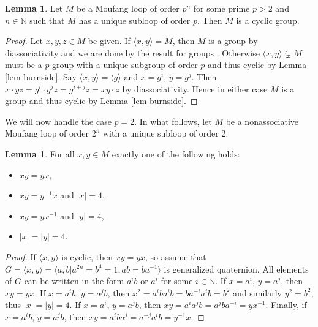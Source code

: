 \documentclass[12pt, twoside, openright]{report}
\theoremstyle{definition}
\newtheorem{lem}[thm]{Lemma}
\begin{document}
\begin{lem}\label{not2power}
	Let $M$ be a Moufang loop of order $p^n$ for some prime $p > 2$ and $n\in\mathbb{N}$ such that $M$ has a
    unique subloop of order $p$. Then $M$ is a cyclic group.
\end{lem}

\begin{proof}
    Let $x, y, z\in M$ be given. If $\langle x, y\rangle = M$, then $M$ is a group by diassociativity and
      we are done by the result for groups \cite{Burnside}. Otherwise $\langle x, y\rangle \subsetneq M$
      must be a $p$-group with a unique subgroup of order $p$ and thus cyclic by Lemma \ref{lem-burnside}.
      Say $\langle x, y\rangle = \langle g\rangle$ and $x = g^i$, $y = g^j$. Then
      $x\cdot yz = g^i \cdot g^j z = g^{i + j}z = xy\cdot z$ by diassociativity. Hence in either case 
      $M$ is a group and thus cyclic by Lemma \ref{lem-burnside}.
\end{proof}

We will now handle the case $p = 2$. In what follows, let $M$ be a nonassociative Moufang loop of order $2^n$
  with a unique subloop of order $2$.

\begin{lem}\label{order-lem}
	For all $x, y\in M$ exactly one of the following holds:
  \begin{itemize}
    \item $xy = yx$,
    \item $xy = y^{-1}x$ and $|x| = 4$,
    \item $xy = yx^{-1}$ and $|y| = 4$,
    \item $|x| = |y| = 4$.
  \end{itemize}
\end{lem}

\begin{proof}
	If $\langle x, y\rangle$ is cyclic, then $xy = yx$, so assume that
    $G = \langle x, y\rangle = \langle a, b | a^{2n} = b^4 = 1, ab = ba^{-1}\rangle$ is generalized
    quaternion. All elements of $G$ can be written in the form $a^i b$ or $a^i$ for some
    $i\in\mathbb{N}$. If $x = a^i$, $y = a^j$, then $xy = yx$. If $x = a^i b$, $y = a^j b$,
    then $x^2 = a^i b a^i b = b a^{-i} a^i b = b^2$ and similarly $y^2 = b^2$,
    thus $|x| = |y| = 4$. If $x = a^i$, $y = a^j b$, then $xy = a^i a^j b = a^j b a^{-i} = yx^{-1}$.
    Finally, if $x = a^i b$, $y = a^j b$, then $xy = a^i b a^j = a^{-j} a^i b = y^{-1} x$.
\end{proof}
\end{document}
